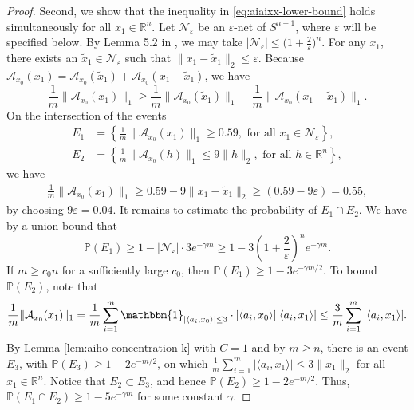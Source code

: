 \documentclass[12pt]{article}
\newcommand{\1}{\mathbbm{1}}
\newcommand{\xo}{x_0}
\newcommand{\R}{\mathbb{R}}
\newcommand{\eps}{\varepsilon}
\newcommand{\inddef}{\mathbbm{1}_{|\langle a_i, \xo \rangle| \leq 3}}
\newcommand{\aixo}{\langle a_i, \xo \rangle}
\newcommand{\aixone}{\langle a_i, x_1 \rangle}
\newcommand{\xtilde}{\tilde{x}}
\newcommand{\A}{\mathcal{A}}
\newcommand{\Axo}{\A_{\xo}}
\newcommand{\PP}{\mathbb{P}}
\begin{document}
\begin{proof}
Second, we show that the inequality in \eqref{eq:aiaixx-lower-bound} holds simultaneously for all $x_1\in\R^n$.  Let $\mathcal{N}_\eps$ be an $\eps$-net of $S^{n-1}$, where $\eps$ will be specified below.  By Lemma 5.2 in \cite{V2012}, we may take $| \mathcal{N}_\eps| \leq \bigl(1 + \frac{2}{\eps} \bigr)^n$.   For any $x_1$, there exists an $\xtilde_1 \in \mathcal{N}_\eps$ such that 
$
\| x_1- \xtilde_1\|_2
\leq  \eps.
$
Because $\Axo(x_1) = \Axo( \xtilde_1) + \Axo(x_1  - \xtilde_1)$, we have
$$
\frac{1}{m}\|\Axo( x_1)\|_1 \geq \frac{1}{m} \| \Axo( \xtilde_1) \|_1 - \frac{1}{m}\|\Axo( x_1 - \xtilde_1)\|_1.
$$
On the intersection of the events 
\begin{align*}
E_1 &= \left \{\frac{1}{m} \|\Axo(x_1) \|_1 \geq 0.59, \text{ for all }  x_1 \in \mathcal{N}_\eps \right \},\\
E_2 &= \left \{\frac{1}{m}\| \Axo(h) \|_1 \leq 9 \|h\|_2, \text{ for all } h \in \R^{n} \right \},
\end{align*}
we have
\begin{align*}
\frac{1}{m}\|\Axo( x_1)\|_1 \geq 0.59 - 9 \| x_1 - \xtilde_1\|_2 \geq (0.59 - 9 \eps)  = 0.55,
\end{align*}
by choosing $9 \eps = 0.04$.  
It remains to estimate the probability of $E_1\cap E_2$.   We have by a union bound that $$\PP(E_1) \geq 1 - | \mathcal{N}_\eps | \cdot 3 e^{-\gamma m} \geq 1 - 3 \left ( 1 + \frac{2}{\eps}\right )^{n} e^{- \gamma m}.$$  If $m \geq c_0 n$ for a sufficiently large $c_0$,  then $\PP(E_1) \geq 1 - 3 e ^{-\gamma m/2}$.  
To bound $\PP(E_2)$, note that
\begin{align*}
\frac{1}{m} \| \Axo(x_1) \|_1  = \frac{1}{m} \sum_{i=1}^m \inddef \cdot |\aixo| |\aixone| \leq \frac{3}{m} \sum_{i=1}^m | \aixone|. 
\end{align*}
By Lemma \ref{lem:aiho-concentration-k} with $C=1$ and by $m \geq n$, there is an event $E_3$, with $\PP(E_3) \geq 1 - 2 e^{-m/2}$, on which $\frac{1}{m} \sum_{i=1}^m | \aixone| \leq 3 \| x_1 \|_2$ for all $x_1 \in \R^n$.  Notice that $E_2 \subset E_3$, and hence $\PP(E_2) \geq 1 - 2 e^{-m/2}$.  
Thus, $\PP(E_1 \cap E_2) \geq 1 - 5 e^{-\gamma m}$ for some constant $\gamma$.

\end{proof}
\end{document}
